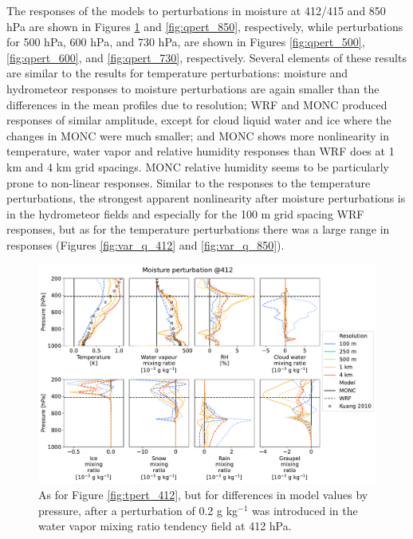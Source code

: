 \documentclass[draft]{agujournal2019}
\begin{document}
The responses of the models to perturbations in moisture at 412/415 and 850 hPa
are shown in Figures \ref{fig:qpert_412} and \ref{fig:qpert_850}, respectively,
while perturbations for 500 hPa, 600 hPa, and 730 hPa, are shown in Figures
\ref{fig:qpert_500}, \ref{fig:qpert_600}, and \ref{fig:qpert_730}, respectively.
Several elements of these results are similar to the results for temperature
perturbations: moisture and hydrometeor responses to moisture perturbations are
again smaller than the differences in the mean profiles due to resolution; WRF
and MONC produced responses of similar amplitude, except for cloud liquid water
and ice where the changes in MONC were much smaller; and MONC shows more
nonlinearity in temperature, water vapor and relative humidity responses than
WRF does at 1 km and 4 km grid spacings. MONC relative humidity seems to be
particularly prone to non-linear responses. Similar to the responses to the
temperature perturbations, the strongest apparent nonlinearity after moisture
perturbations is in the hydrometeor fields and especially for the 100 m grid
spacing WRF responses, but as for the temperature perturbations there was a
large range in responses (Figures \ref{fig:var_q_412} and \ref{fig:var_q_850}).

\begin{figure}[pth]
    \noindent\includegraphics[width=\textwidth]{figures/pert_diffs_q_0.0002_@412}
    \caption{As for Figure \ref{fig:tpert_412}, but for differences in model
    values by pressure, after a perturbation of 0.2 g kg$^{-1}$ was introduced
    in the water vapor mixing ratio tendency field at 412 hPa.}
    \label{fig:qpert_412}
\end{figure}
\end{document}
